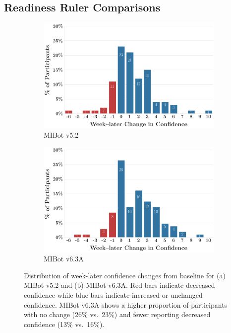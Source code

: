 \subsection{Readiness Ruler Comparisons}
\begin{figure}[htbp]
    \centering
    \begin{subfigure}[b]{0.48\textwidth}
        \centering
        \includegraphics[width=\textwidth]{fig/MIV5.2_ruler_deltas_delta_with_week_later_keep_high_conf_False_change.png}
        \caption{MIBot v5.2}
        \label{fig:confidence_v5.2}
    \end{subfigure}
    \hfill
    \begin{subfigure}[b]{0.48\textwidth}
        \centering
        \includegraphics[width=\textwidth]{fig/2024-11-14-MIV6.3A-2024-11-22-MIV6.3A_ruler_deltas_delta_with_week_later_keep_high_conf_False_change.png}
        \caption{MIBot v6.3A}
        \label{fig:confidence_v6.3}
    \end{subfigure}

    
    \caption{Distribution of week-later confidence changes from baseline for (a) MIBot v5.2 and (b) MIBot v6.3A. Red bars indicate decreased confidence while blue bars indicate increased or unchanged confidence. MIBot v6.3A shows a higher proportion of participants with no change (26\% vs.\ 23\%) and fewer reporting decreased confidence (13\% vs.\ 16\%).}
    \label{fig:confidence_distributions}
\end{figure}










